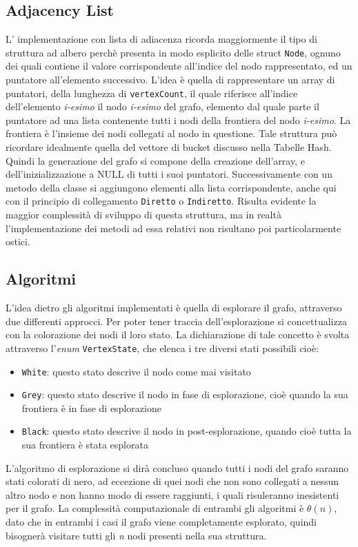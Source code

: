 \documentclass{article}
\begin{document}
\subsection{Adjacency List}
L' implementazione con lista di adiacenza ricorda maggiormente il tipo di struttura ad albero perch\`e presenta in modo esplicito delle struct \texttt{Node}, ognuno dei quali contiene il valore corrispondente all'indice del nodo rappresentato, ed un puntatore all'elemento successivo.\newline
L'idea \`e quella di rappresentare un array di puntatori, della lunghezza di \texttt{vertexCount}, il quale riferisce all'indice dell'elemento \textit{i-esimo} il nodo \textit{i-esimo} del grafo, elemento dal quale parte il puntatore ad una lista contenente tutti i nodi della frontiera del nodo \textit{i-esimo}. La frontiera \`e l'insieme dei nodi collegati al nodo in questione. Tale struttura pu\`o ricordare idealmente quella del vettore di bucket discusso nella Tabelle Hash.\newline
Quindi la generazione del grafo si compone della creazione dell'array, e dell'inizializzazione a NULL di tutti i suoi puntatori. Successivamente con un metodo della classe si aggiungono elementi alla lista corrispondente, anche qui con il principio di collegamento \texttt{Diretto} o \texttt{Indiretto}.
Risulta evidente la maggior complessit\`a di sviluppo di questa struttura, ma in realt\`a l'implementazione dei metodi ad essa relativi non risultano poi particolarmente ostici.

\subsection{Algoritmi}
L'idea dietro gli algoritmi implementati \`e quella di esplorare il grafo, attraverso due differenti approcci.\newline
Per poter tener traccia dell'esplorazione si concettualizza con la colorazione dei nodi il loro stato. La dichiarazione di tale concetto \`e svolta attraverso l'\textit{enum} \texttt{VertexState},  che elenca i tre diversi stati possibili cio\`e:
\begin{itemize}
  \item \texttt{White}: questo stato descrive il nodo come mai visitato
  \item \texttt{Grey}: questo stato descrive il nodo in fase di esplorazione, cio\`e quando la sua frontiera \`e in fase di esplorazione
  \item \texttt{Black}: questo stato descrive il nodo in post-esplorazione, quando cio\`e tutta la sua frontiera \`e stata esplorata
\end{itemize}
L'algoritmo di esplorazione si dir\`a concluso quando tutti i nodi del grafo saranno stati colorati di nero, ad eccezione di quei nodi che non sono collegati a nessun altro nodo e non hanno modo di essere raggiunti, i quali risuleranno inesistenti per il grafo.\newline
La complessit\`a computazionale di entrambi gli algoritmi \`e \textit{$\theta(n)$}, dato che in entrambi i casi il grafo viene completamente esplorato, quindi bisogner\`a visitare tutti gli \textit{n} nodi presenti nella sua struttura.
\end{document}
